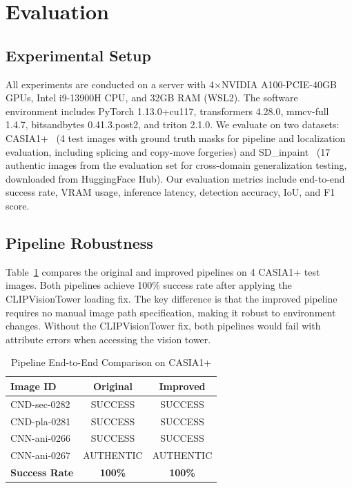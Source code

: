 \section{Evaluation}
\label{sec:evaluation}

\subsection{Experimental Setup}

All experiments are conducted on a server with 4$\times$NVIDIA A100-PCIE-40GB GPUs, Intel i9-13900H CPU, and 32GB RAM (WSL2). The software environment includes PyTorch 1.13.0+cu117, transformers 4.28.0, mmcv-full 1.4.7, bitsandbytes 0.41.3.post2, and triton 2.1.0. We evaluate on two datasets: CASIA1+~\citep{casia1} (4 test images with ground truth masks for pipeline and localization evaluation, including splicing and copy-move forgeries) and SD\_inpaint~\citep{fakeshield2025} (17 authentic images from the evaluation set for cross-domain generalization testing, downloaded from HuggingFace Hub). Our evaluation metrics include end-to-end success rate, VRAM usage, inference latency, detection accuracy, IoU, and F1 score.

\subsection{Pipeline Robustness}

Table~\ref{tab:pipeline_comparison} compares the original and improved pipelines on 4 CASIA1+ test images. Both pipelines achieve 100\% success rate after applying the CLIPVisionTower loading fix. The key difference is that the improved pipeline requires no manual image path specification, making it robust to environment changes. Without the CLIPVisionTower fix, both pipelines would fail with attribute errors when accessing the vision tower.

\begin{table}[t]
\centering
\caption{Pipeline End-to-End Comparison on CASIA1+}
\label{tab:pipeline_comparison}
\begin{tabular}{@{}p{2.2cm}cc@{}}
\toprule
\textbf{Image ID} & \textbf{Original} & \textbf{Improved} \\
\midrule
CND-sec-0282 & SUCCESS & SUCCESS \\
CND-pla-0281 & SUCCESS & SUCCESS \\
CNN-ani-0266 & SUCCESS & SUCCESS \\
CNN-ani-0267 & AUTHENTIC & AUTHENTIC \\
\midrule
\textbf{Success Rate} & \textbf{100\%} & \textbf{100\%} \\
\bottomrule
\end{tabular}
\end{table}

